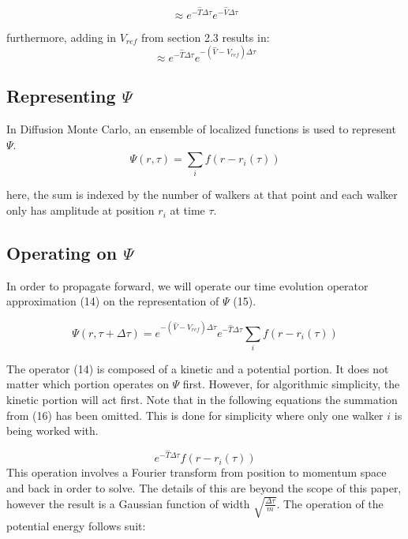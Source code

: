 \documentclass{article}
\begin{document}
\begin{equation} \label{eqn}
\approx{e^{-\hat{T}\Delta\tau}e^{-\hat{V}\Delta\tau}}
\end{equation}

furthermore, adding in $V_{ref}$ from section 2.3 results in:
\begin{equation} \label{eqn}
\approx{e^{-\hat{T}\Delta\tau}e^{-(\hat{V}-V_{ref})\Delta\tau}}
\end{equation}

\subsection{Representing $\Psi$}
In Diffusion Monte Carlo, an ensemble of localized functions is used to represent $\Psi$.
\begin{equation} \label{eqn}
\Psi(r,\tau)=\sum_{i}f(r-r_{i}(\tau))
\end{equation}

here, the sum is indexed by the number of walkers at that point and each walker only has amplitude at position $r_{i}$ at time $\tau$. 

\subsection{Operating on $\Psi$}
In order to propagate forward, we will operate our time evolution operator approximation (14) on the representation of $\Psi$ (15).  

\begin{equation} \label{eqn}
\Psi(r,\tau+\Delta\tau)=e^{-(\hat{V}-V_{ref})\Delta\tau}e^{-\hat{T}\Delta\tau}\sum_{i}f(r-r_{i}(\tau))
\end{equation}

The operator (14) is composed of a kinetic and a potential portion. It does not matter which portion operates on $\Psi$ first. However, for algorithmic simplicity, the kinetic portion will act first. Note that in the following equations the summation from (16) has been omitted. This is done for simplicity where only one walker $i$ is being worked with.

\begin{equation} \label{eqn}
e^{-\hat{T}\Delta\tau}f(r-r_{i}(\tau))
\end{equation}
This operation involves a Fourier transform from position to momentum space and back in order to solve. The details of this are beyond the scope of this paper, however the result is a Gaussian function of width $\sqrt{\frac{\Delta\tau}{m}}$. The operation of the potential energy follows suit:
\end{document}

